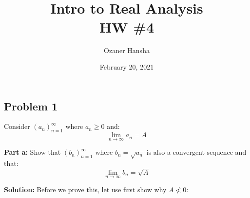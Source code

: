 \documentclass{article}
\begin{document}
\title{Intro to Real Analysis\\HW \#4}
\author{Ozaner Hansha}
\date{February 20, 2021}
\maketitle

\subsection*{Problem 1}
Consider $(a_n)_{n=1}^\infty$ where $a_n\ge 0$ and:
$$\lim_{n\to\infty} a_n=A$$

\noindent\textbf{Part a:} Show that $(b_n)_{n=1}^\infty$ where $b_n=\sqrt{a_n}$ is also a convergent sequence and that:
$$\lim_{n\to\infty} b_n=\sqrt{A}$$

\noindent\textbf{Solution:} Before we prove this, let use first show why $A\not<0$:
\end{document}
